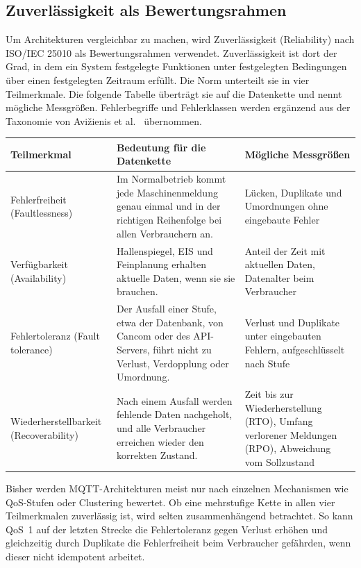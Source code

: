 \documentclass[11pt, a4paper]{article}
\begin{document}
\subsection{Zuverlässigkeit als Bewertungsrahmen}

Um Architekturen vergleichbar zu machen, wird Zuverlässigkeit (Reliability) nach ISO/IEC 25010 \cite{iso25010} als Bewertungsrahmen verwendet. Zuverlässigkeit ist dort der Grad, in dem ein System festgelegte Funktionen unter festgelegten Bedingungen über einen festgelegten Zeitraum erfüllt. Die Norm unterteilt sie in vier Teilmerkmale. Die folgende Tabelle überträgt sie auf die Datenkette und nennt mögliche Messgrößen. Fehlerbegriffe und Fehlerklassen werden ergänzend aus der Taxonomie von Avižienis et al.\ \cite{avizienis2004taxonomy} übernommen.

\begin{center}
\small
\begin{tabularx}{\textwidth}{@{}p{2.6cm} X X@{}}
\toprule
\textbf{Teilmerkmal} & \textbf{Bedeutung für die Datenkette} & \textbf{Mögliche Messgrößen} \\
\midrule
Fehlerfreiheit (Faultlessness) & Im Normalbetrieb kommt jede Maschinenmeldung genau einmal und in der richtigen Reihenfolge bei allen Verbrauchern an. & Lücken, Duplikate und Umordnungen ohne eingebaute Fehler \\
Verfügbarkeit (Availability) & Hallenspiegel, EIS und Feinplanung erhalten aktuelle Daten, wenn sie sie brauchen. & Anteil der Zeit mit aktuellen Daten, Datenalter beim Verbraucher \\
Fehlertoleranz (Fault tolerance) & Der Ausfall einer Stufe, etwa der Datenbank, von Cancom oder des API-Servers, führt nicht zu Verlust, Verdopplung oder Umordnung. & Verlust und Duplikate unter eingebauten Fehlern, aufgeschlüsselt nach Stufe \\
Wiederherstellbarkeit (Recoverability) & Nach einem Ausfall werden fehlende Daten nachgeholt, und alle Verbraucher erreichen wieder den korrekten Zustand. & Zeit bis zur Wiederherstellung (RTO), Umfang verlorener Meldungen (RPO), Abweichung vom Sollzustand \\
\bottomrule
\end{tabularx}
\end{center}

Bisher werden MQTT-Architekturen meist nur nach einzelnen Mechanismen wie QoS-Stufen oder Clustering bewertet. Ob eine mehrstufige Kette in allen vier Teilmerkmalen zuverlässig ist, wird selten zusammenhängend betrachtet. So kann QoS~1 auf der letzten Strecke die Fehlertoleranz gegen Verlust erhöhen und gleichzeitig durch Duplikate die Fehlerfreiheit beim Verbraucher gefährden, wenn dieser nicht idempotent arbeitet.
\end{document}
